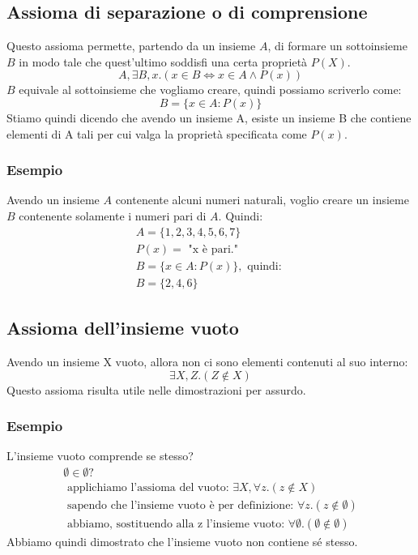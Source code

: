 \documentclass[12pt]{article}
\begin{document}
\subsection{Assioma di separazione o di comprensione}
Questo assioma permette, partendo da un insieme $A$, di formare un sottoinsieme $B$ in modo tale che quest'ultimo soddisfi una certa proprietà $P(X)$.
\begin{equation}
    A, \exists B, x.(x \in B \Leftrightarrow x \in A \wedge P(x)) \label{ass:separazione_comprensione} \tag{ax. 2}
\end{equation}
$B$ equivale al sottoinsieme che vogliamo creare, quindi possiamo scriverlo come:
\begin{equation}
    B = \{x \in A : P(x)\} \label{def:insieme_B_separazione_comprensione}
\end{equation}
Stiamo quindi dicendo che avendo un insieme A, esiste un insieme B che contiene elementi di A tali per cui valga la proprietà specificata come $P(x)$.
\subsubsection{Esempio}
Avendo un insieme $A$ contenente alcuni numeri naturali, voglio creare un insieme $B$ contenente solamente i numeri pari di $A$. Quindi:
\begin{gather*}
    A = \{1, 2, 3, 4, 5, 6, 7\}\\
    P(x) = \text{ "x è pari."}\\
    B = \{x \in A : P(x)\}, \text{ quindi: }\\
    B = \{2, 4, 6\} 
\end{gather*}
\subsection{Assioma dell'insieme vuoto}
Avendo un insieme X vuoto, allora non ci sono elementi contenuti al suo interno:
\begin{equation}
    \exists X, Z.(Z \not\in X) \label{ass:insieme_vuoto} \tag{ax. 3}
\end{equation}
Questo assioma risulta utile nelle dimostrazioni per assurdo.
\subsubsection{Esempio}
L'insieme vuoto comprende se stesso?
\begin{gather*}
    \emptyset \in \emptyset?\\
    \text{ applichiamo l'assioma del vuoto: } \exists X, \forall z. (z \not\in X)\\
    \text{ sapendo che l'insieme vuoto è per definizione: } \forall z. (z \not\in \emptyset)\\
    \text{ abbiamo, sostituendo alla z l'insieme vuoto: } \forall \emptyset. (\emptyset \not\in \emptyset)
\end{gather*}
Abbiamo quindi dimostrato che l'insieme vuoto non contiene sé stesso.
\pagebreak
\end{document}
